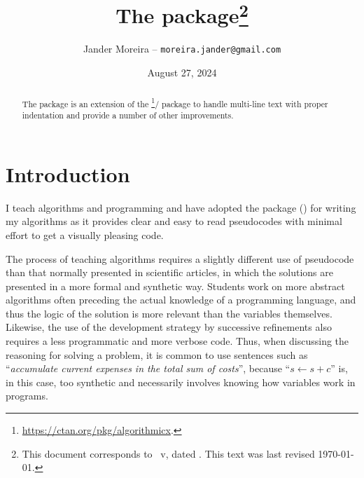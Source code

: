 \documentclass[a4paper, 11pt]{article}
\title{%
    The \PackageName{algxpar} package\thanks{This document corresponds to \PackageName{algxpar}~v\AlgVersion, dated \AlgDate.
    This text was last revised \today.}%
}
\author{Jander Moreira -- \texttt{moreira.jander@gmail.com}}
\date{August 27, 2024}
\begin{document}
\maketitle
\sloppy

\begin{abstract}
    The  package is an extension of the \footnote{\url{https://ctan.org/pkg/algorithmicx}.}/ package to handle multi-line text with proper indentation and provide a number of other improvements.
\end{abstract}

\tableofcontents


\begin{figure}
    \vspace{3em}
\end{figure}




\VCPrintChanges


\section{Introduction}
I teach algorithms and programming and have adopted the  package () for writing my algorithms as it provides clear and easy to read pseudocodes with minimal effort to get a visually pleasing code.

The process of teaching algorithms requires a slightly different use of pseudocode than that normally presented in scientific articles, in which the solutions are presented in a more formal and synthetic way. Students work on more abstract algorithms often preceding the actual knowledge of a programming language, and thus the logic of the solution is more relevant than the variables themselves. Likewise, the use of the development strategy by successive refinements also requires a less programmatic and more verbose code. Thus, when discussing the reasoning for solving a problem, it is common to use sentences such as ``\emph{accumulate current expenses in the total sum of costs}'', because ``${s \gets s + c}$'' is, in this case, too synthetic and necessarily involves knowing how variables work in programs.
\end{document}
